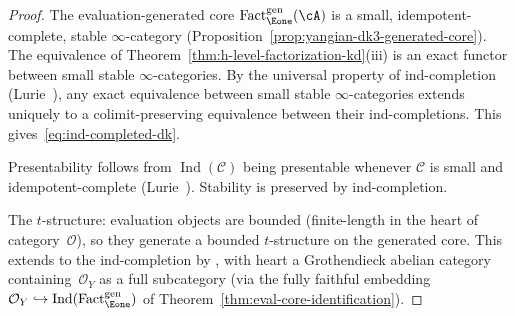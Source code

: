 \begin{proof}
The evaluation-generated core
$\operatorname{Fact}_{\Eone}^{\mathrm{gen}}(\cA)$ is a small,
idempotent-complete, stable $\infty$-category
(Proposition~\ref{prop:yangian-dk3-generated-core}).  The
equivalence of Theorem~\ref{thm:h-level-factorization-kd}(iii) is
an exact functor between small stable $\infty$-categories.  By
the universal property of ind-completion
(Lurie~\cite[Prop.~5.3.5.10]{HTT}), any exact equivalence between
small stable $\infty$-categories extends uniquely to a
colimit-preserving equivalence between their ind-completions.
This gives~\eqref{eq:ind-completed-dk}.

Presentability follows from $\operatorname{Ind}(\mathcal{C})$
being presentable whenever $\mathcal{C}$ is small and
idempotent-complete (Lurie~\cite[Prop.~5.5.7.8]{HTT}).
Stability is preserved by ind-completion.

The $t$-structure: evaluation objects are
bounded (finite-length in the heart of category~$\mathcal{O}$),
so they generate a bounded $t$-structure on the generated
core.  This extends to the ind-completion by
\cite[Prop.~1.3.5.21]{HA}, with heart a Grothendieck abelian
category containing~$\mathcal{O}_Y$ as a full subcategory
(via the fully faithful embedding
$\mathcal{O}_Y \hookrightarrow
\operatorname{Ind}(\operatorname{Fact}_{\Eone}^{\mathrm{gen}})$
of Theorem~\ref{thm:eval-core-identification}).
\end{proof}

